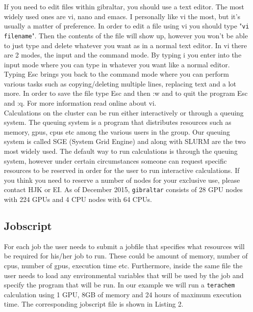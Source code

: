 \documentclass[a4paper,12pt]{assignment}
\begin{document}
If you need to edit files within gibraltar, you should use a text editor. The most widely used ones are vi, nano and emacs. I personally like vi the most, but it's usually a matter of preference. In order to edit a file using vi you should type "\texttt{vi filename}". Then the contents of the file will show up, however you won't be able to just type and delete whatever you want as in a normal text editor. In vi there are 2 modes, the input and the command mode. By typing i you enter into the input mode where you can type in whatever you want like a normal editor. Typing Esc brings you back to the command mode where you can perform various tasks such as copying/deleting multiple lines, replacing text and a lot more. In order to save the file type Esc and then :w and to quit the program Esc and :q. For more information read online about vi. \\

Calculations on the cluster can be run either interactively or through a queuing system. The queuing system is a program that distributes resources such as memory, gpus, cpus etc among the various users in the group. Our queuing system is called SGE (System Grid Engine) and along with SLURM are the two most widely used. The default way to run calculations is through the queuing system, however under certain circumstances someone can request specific resources to be reserved in order for the user to run interactive calculations. If you think you need to reserve a number of nodes for your exclusive use, please contact HJK or EI. As of December 2015, \texttt{gibraltar} consists of 28 GPU nodes with 224 GPUs and 4 CPU nodes with 64 CPUs.

\subsection*{Jobscript}

For each job the user needs to submit a jobfile that specifies what resources will be required for his/her job to run. These could be amount of memory, number of cpus, number of gpus, execution time etc. Furthermore, inside the same file the user needs to load any environmental variables that will be used by the job and specify the program that will be run. In our example we will run a \texttt{terachem} calculation using 1 GPU, 8GB of memory and 24 hours of maximum execution time. The corresponding jobscript file is shown in Listing 2.\\
\end{document}
